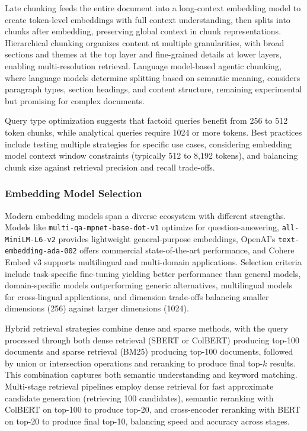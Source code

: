 \documentclass[11pt,letterpaper]{article}
\begin{document}
Late chunking feeds the entire document into a long-context embedding model to create token-level embeddings with full context understanding, then splits into chunks after embedding, preserving global context in chunk representations. Hierarchical chunking organizes content at multiple granularities, with broad sections and themes at the top layer and fine-grained details at lower layers, enabling multi-resolution retrieval. Language model-based agentic chunking, where language models determine splitting based on semantic meaning, considers paragraph types, section headings, and content structure, remaining experimental but promising for complex documents.

Query type optimization suggests that factoid queries benefit from 256 to 512 token chunks, while analytical queries require 1024 or more tokens. Best practices include testing multiple strategies for specific use cases, considering embedding model context window constraints (typically 512 to 8,192 tokens), and balancing chunk size against retrieval precision and recall trade-offs.

\subsubsection{Embedding Model Selection}

Modern embedding models span a diverse ecosystem with different strengths. Models like {\tt multi-qa-mpnet-base-dot-v1} optimize for question-answering, {\tt all-MiniLM-L6-v2} provides lightweight general-purpose embeddings, OpenAI's {\tt text-embedding-ada-002} offers commercial state-of-the-art performance, and Cohere Embed v3 supports multilingual and multi-domain applications. Selection criteria include task-specific fine-tuning yielding better performance than general models, domain-specific models outperforming generic alternatives, multilingual models for cross-lingual applications, and dimension trade-offs balancing smaller dimensions (256) against larger dimensions (1024).

Hybrid retrieval strategies combine dense and sparse methods, with the query processed through both dense retrieval (SBERT or ColBERT) producing top-100 documents and sparse retrieval (BM25) producing top-100 documents, followed by union or intersection operations and reranking to produce final top-$k$ results. This combination captures both semantic understanding and keyword matching. Multi-stage retrieval pipelines employ dense retrieval for fast approximate candidate generation (retrieving 100 candidates), semantic reranking with ColBERT on top-100 to produce top-20, and cross-encoder reranking with BERT on top-20 to produce final top-10, balancing speed and accuracy across stages.
\end{document}
